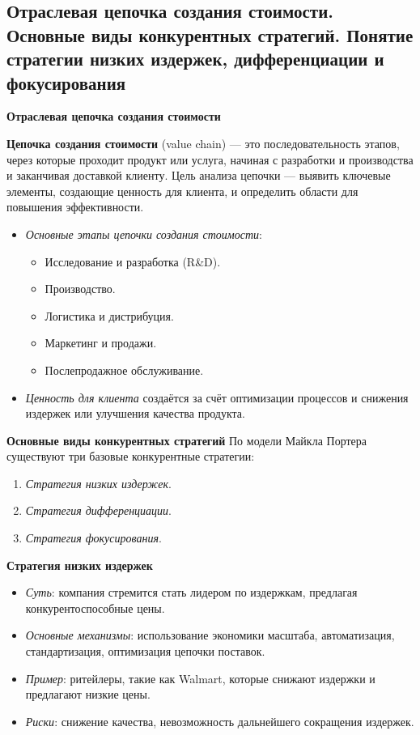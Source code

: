 \pagebreak
\subsection{Отраслевая цепочка создания стоимости. Основные виды конкурентных стратегий. Понятие стратегии низких издержек, дифференциации и фокусирования}

\textbf{Отраслевая цепочка создания стоимости}

\textbf{Цепочка создания стоимости} (value chain) --- это последовательность этапов, через которые проходит продукт или услуга, начиная с разработки и производства и заканчивая доставкой клиенту. Цель анализа цепочки --- выявить ключевые элементы, создающие ценность для клиента, и определить области для повышения эффективности.

\begin{itemize}
    \item \textit{Основные этапы цепочки создания стоимости}:
    \begin{itemize}
        \item Исследование и разработка (R\&D).
        \item Производство.
        \item Логистика и дистрибуция.
        \item Маркетинг и продажи.
        \item Послепродажное обслуживание.
    \end{itemize}
    \item \textit{Ценность для клиента} создаётся за счёт оптимизации процессов и снижения издержек или улучшения качества продукта.
\end{itemize}

\textbf{Основные виды конкурентных стратегий}
По модели Майкла Портера существуют три базовые конкурентные стратегии:
\begin{enumerate}
    \item \textit{Стратегия низких издержек}.
    \item \textit{Стратегия дифференциации}.
    \item \textit{Стратегия фокусирования}.
\end{enumerate}

\textbf{Стратегия низких издержек}
\begin{itemize}
    \item \textit{Суть}: компания стремится стать лидером по издержкам, предлагая конкурентоспособные цены.
    \item \textit{Основные механизмы}: использование экономики масштаба, автоматизация, стандартизация, оптимизация цепочки поставок.
    \item \textit{Пример}: ритейлеры, такие как Walmart, которые снижают издержки и предлагают низкие цены.
    \item \textit{Риски}: снижение качества, невозможность дальнейшего сокращения издержек.
\end{itemize}

